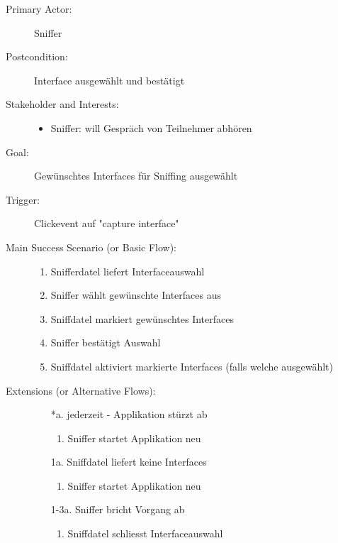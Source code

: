 \documentclass[a4,12pt]{scrartcl}
\begin{document}
\begin{description}
  \item[Primary Actor:] Sniffer
  \item[Postcondition:] Interface ausgewählt und bestätigt
  \item[Stakeholder and Interests:] \hfill
  	\begin{itemize}
  		\item Sniffer: will Gespräch von Teilnehmer abhören 
  	\end{itemize}
  \item[Goal:] Gewünschtes Interfaces für Sniffing ausgewählt
  \item[Trigger:] Clickevent auf "capture interface"
  \item[Main Success Scenario (or Basic Flow):] \hfill
  	\begin{enumerate}
  		\item Snifferdatel liefert Interfaceauswahl
  		\item Sniffer wählt gewünschte Interfaces aus
  		\item Sniffdatel markiert gewünschtes Interfaces
  		\item Sniffer bestätigt Auswahl
  		\item Sniffdatel aktiviert markierte Interfaces (falls welche ausgewählt)
	\end{enumerate}
  \item[Extensions (or Alternative Flows):] \hfill
  	\begin{itemize}
		\item[*a.] jederzeit - Applikation stürzt ab
  			\begin{enumerate}
  				\item Sniffer startet Applikation neu 		 
			\end{enumerate}
		\item[1a.] Sniffdatel liefert keine Interfaces
  			\begin{enumerate}
  				\item Sniffer startet Applikation neu 		 
			\end{enumerate}
		\item[1-3a.] Sniffer bricht Vorgang ab
  			\begin{enumerate}
  				\item Sniffdatel schliesst Interfaceauswahl		 
			\end{enumerate}	
	\end{itemize}
\end{description}
\end{document}
